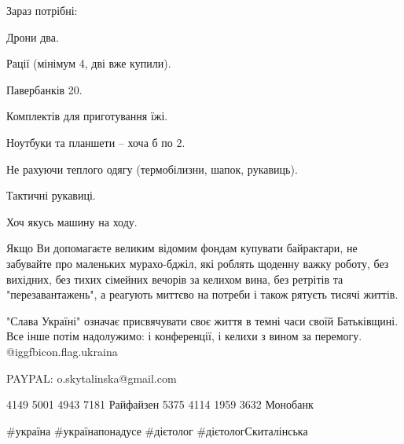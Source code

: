 Зараз потрібні:

Дрони два.

Рації (мінімум 4, дві вже купили).

Павербанків 20.

Комплектів для приготування їжі.

Ноутбуки та планшети -- хоча б по 2.

Не рахуючи теплого одягу (термобілизни, шапок, рукавиць).

Тактичні рукавиці.

Хоч якусь машину на ходу. 

Якщо Ви допомагаєте великим відомим фондам купувати байрактари, не забувайте
про маленьких мурахо-бджіл, які роблять щоденну важку роботу, без вихідних, без
тихих сімейних вечорів за келихом вина, без ретрітів та "перезавантажень", а
реагують миттєво на потреби і також рятуєть тисячі життів.

"Слава Україні" \dshM означає присвячувати своє життя в темні часи своїй
Батьківщині. Все інше потім надолужимо: і конференції, і келихи з вином за
перемогу.
@igg{fbicon.flag.ukraina}

PAYPAL: o.skytalinska@gmail.com

4149 5001 4943 7181 Райфайзен
5375 4114 1959 3632 Монобанк

\#україна \#українапонадусе \#дієтолог \#дієтологСкиталінська

